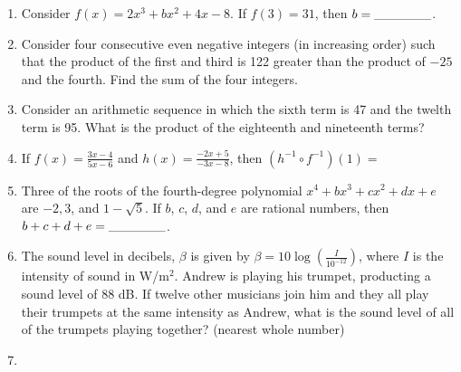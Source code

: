\documentclass[../uilmath.tex]{subfiles}
\begin{document}
\begin{enumerate}[label=\bfseries\arabic*.]
        \item %
        Consider $f(x)=2x^3+bx^2+4x-8$. If $f(3)=31$, then $b=\_\_\_\_\_\_$.

        \item %
        Consider four consecutive even negative integers (in increasing order) such that the product of the first and third 
        is 122 greater than the product of $-25$ and the fourth. Find the sum of the four integers.

        \item %
        Consider an arithmetic sequence in which the sixth term is 47 and the twelth term is 95. What is the product of the eighteenth and nineteenth terms?

        \item %
        If $f(x)=\frac{3x-4}{5x-6}$ and $h(x)=\frac{-2x+5}{-3x-8}$, then $\left(h^{-1}\circ f^{-1}\right)(1)=$

        \item %
        Three of the roots of the fourth-degree polynomial $x^4+bx^3+cx^2+dx+e$ are $-2,3$, and $1-\sqrt{5}$. If $b$, $c$, $d$, and $e$
        are rational numbers, then $b+c+d+e=\_\_\_\_\_\_$.

        \item %
        The sound level in decibels, $\beta$ is given by $\beta = 10\log\left(\frac{I}{10^{-12}}\right)$, where $I$ is the intensity of sound in W/m$^2$.
        Andrew is playing his trumpet, producting a sound level of 88 dB. If twelve other musicians join him and they all play their trumpets at the same intensity as Andrew,
        what is the sound level of all of the trumpets playing together? (nearest whole number)

        \item %
        
\end{enumerate}
\end{document}
